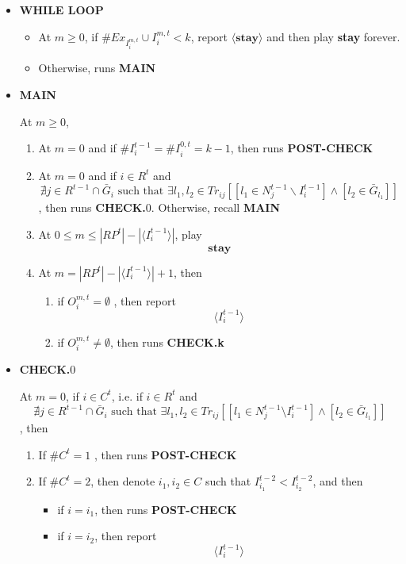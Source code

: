 \documentclass[12pt,letterpaper]{article}
\theoremstyle{definition}
\theoremstyle{remark}
\theoremstyle{claim}
\begin{document}
\begin{itemize}

\item \textbf{WHILE LOOP}
\begin{itemize}
\item At $m\geq 0$, if $\# Ex_{I^{m,t}_i}\cup I^{m,t}_i< k$, report $\langle \textbf{stay} \rangle$ and then play \textbf{stay} forever.
\item Otherwise, runs \textbf{MAIN }
\end{itemize}


\item \textbf{MAIN}

At $m\geq 0$, 

\begin{enumerate}
\item At $m=0$ and if $\# I^{t-1}_i=\# I^{0,t}_i= k-1$, then 
runs \textbf{POST-CHECK }


\item At $m=0$ and if $i\in R^t$ and
\[\nexists j\in R^{t-1}\cap\bar{G}_i \text{ such that }\exists l_1,l_2\in Tr_{ij}[[l_1\in N^{t-1}_j\backslash I^{t-1}_i] \wedge [l_2\in \bar{G}_{l_1}]]\]
, then runs \textbf{CHECK.$0$}. Otherwise, recall \textbf{MAIN}
\item At $0\leq m \leq |RP^t|-|\langle I^{t-1}_i \rangle|$, play
\[\textbf{stay}\]
\item At $m = |RP^t|-|\langle I^{t-1}_i \rangle|+1$, then
\begin{enumerate}
\item if $O^{m,t}_i= \emptyset$ 
, then report
\[\langle I^{t-1}_i \rangle\]
\item if $O^{m,t}_i\neq \emptyset$, then runs \textbf{CHECK.k}

\end{enumerate}

\end{enumerate}





\item \textbf{CHECK.$0$}

At $m=0$, if $i\in C^t$, i.e. if $i\in R^t$ and
\[\nexists j\in R^{t-1}\cap \bar{G}_i \text{ such that }\exists l_1,l_2\in Tr_{ij}[[l_1\in N^{t-1}_j\setminus I^{t-1}_i] \wedge [l_2\in \bar{G}_{l_1}]]\]
, then
\begin{enumerate}
\item If $\#C^t=1$
, then runs
\textbf{POST-CHECK }

\item If $\#C^t=2$, then denote $i_1,i_2\in C$ such that $I^{t-2}_{i_1}<I^{t-2}_{i_2}$, and then
\begin{itemize}
\item if $i=i_1$, then runs
\textbf{POST-CHECK }
\item if $i=i_2$, then report
\[\langle I^{t-1}_i \rangle\]


\end{itemize}
\end{enumerate}
\end{itemize}
\end{document}
